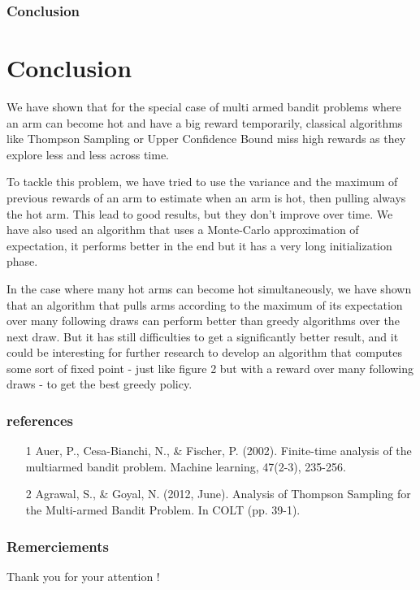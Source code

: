 \documentclass[french]{beamer}
\begin{document}
\begin{frame}
	\frametitle{Conclusion}
	
	\section{Conclusion}
	
	We have shown that for the special case of multi armed bandit problems where an arm can become hot and have a big reward temporarily, classical algorithms like Thompson Sampling or Upper Confidence Bound miss high rewards as they explore less and less across time.
	
	To tackle this problem, we have tried to use the variance and the maximum of previous rewards of an arm to estimate when an arm is hot, then pulling always the hot arm. This lead to good results, but they don't improve over time. We have also used an algorithm that uses a Monte-Carlo approximation of expectation, it performs better in the end but it has a very long initialization phase.
	
	In the case where many hot arms can become hot simultaneously, we have shown that an algorithm that pulls arms according to the maximum of its expectation over many following draws can perform better than greedy algorithms over the next draw. But it has still difficulties to get a significantly better result, and it could be interesting for further research to develop an algorithm that computes some sort of fixed point - just like figure 2 but with a reward over many following draws - to get the best greedy policy.
	
\end{frame}

\begin{frame}
	\frametitle{references}
	
	
	\small{
		\begin{itemize}
		\item [1] Auer, P., Cesa-Bianchi, N., \& Fischer, P. (2002). Finite-time analysis of the multiarmed bandit problem. Machine learning, 47(2-3), 235-256.
		
		\item [2] Agrawal, S., \& Goyal, N. (2012, June). Analysis of Thompson Sampling for the Multi-armed Bandit Problem. In COLT (pp. 39-1).
		\end{itemize}
	}
\end{frame}
	
	\begin{frame}
	\frametitle{Remerciements}
	
	Thank you for your attention !
	
	\end{frame}
\end{document}
